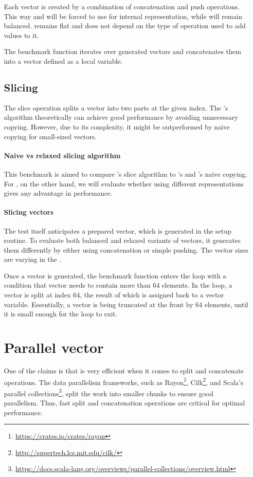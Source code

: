Each vector is created by a combination of concatenation and push operations. This way \pvec{} and \rrbvec{} will be forced to use \rrbtree{} for internal representation, while \rbvec{} will remain balanced. \stdvec{} remains flat and does not depend on the type of operation used to add values to it. 

The benchmark function iterates over generated vectors and concatenates them into a vector defined as a local variable. 

\subsection{Slicing}
The slice operation splits a vector into two parts at the given index. The \rrbtree{}'s algorithm theoretically can achieve good performance by avoiding unnecessary copying. However, due to its complexity, it might be outperformed by naive copying for small-sized vectors.

\paragraph*{Naive vs relaxed slicing algorithm}
This benchmark is aimed to compare \rrbvec{}'s slice algorithm to \stdvec{}'s and \rbvec{}'s naive copying. For \pvec{}, on the other hand, we will evaluate whether using different representations gives any advantage in performance. 

\paragraph*{Slicing vectors}
The test itself anticipates a prepared vector, which is generated in the setup routine. To evaluate both balanced and relaxed variants of vectors, it generates them differently by either using concatenation or simple pushing. The vector sizes are varying in the \range{[128, 40000]}. 

Once a vector is generated, the benchmark function enters the loop with a condition that vector needs to contain more than 64 elements. In the loop, a vector is split at index 64, the result of which is assigned back to a vector variable. Essentially, a vector is being truncated at the front by 64 elements, until it is small enough for the loop to exit. 

\section{Parallel vector}
One of the claims is that \rrbvec{} is very efficient when it comes to split and concatenate operations. The data parallelism frameworks, such as Rayon\footnote{\url{https://crates.io/crates/rayon}}, Cilk\footnote{\url{http://supertech.lcs.mit.edu/cilk/}}, and Scala's parallel collections\footnote{\url{https://docs.scala-lang.org/overviews/parallel-collections/overview.html}}, split the work into smaller chunks to ensure good parallelism. Thus, fast split and concatenation operations are critical for optimal performance. 

